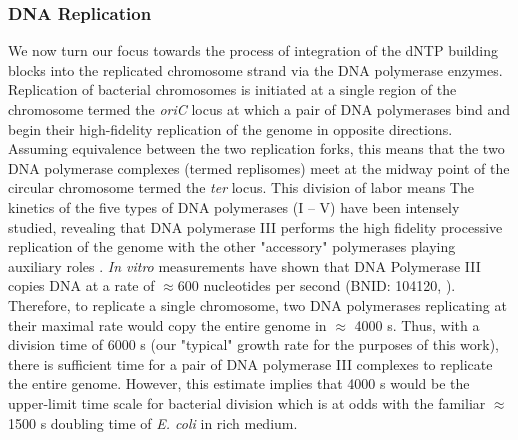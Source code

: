\subsubsection{DNA Replication}
We now turn our focus towards the process of integration of the dNTP building
blocks into the replicated chromosome strand via the DNA polymerase enzymes.
Replication of bacterial chromosomes is initiated at a single region of the
chromosome termed the \textit{oriC} locus at which a pair of DNA polymerases
bind and begin their high-fidelity replication of the genome in opposite
directions. Assuming equivalence between the two replication forks, this
means that the two DNA polymerase complexes (termed replisomes) meet at the midway point of the circular
chromosome termed the \textit{ter} locus. This division of labor means The
kinetics of the five types of DNA polymerases (I -- V) have been intensely
studied, revealing that DNA polymerase III performs the high fidelity
processive replication of the genome with the other "accessory" polymerases
playing auxiliary roles \citep{fijalkowska2012}. \textit{In vitro}
measurements have shown that DNA Polymerase III copies DNA at a rate of
$\approx 600$ nucleotides per second (BNID: 104120, \cite{milo2010}). Therefore,
to replicate a single chromosome, two DNA polymerases replicating at their
maximal rate would copy the entire genome in $\approx$ 4000 s. Thus, with a
division time of 6000 s (our "typical" growth rate for the purposes of this
work), there is sufficient time for a pair of DNA polymerase III complexes to replicate
the entire genome. However, this estimate implies that 4000 s would be the
upper-limit time scale for bacterial division which is at odds with the
familiar $\approx$ 1500 s doubling time of \textit{E. coli} in rich medium.

